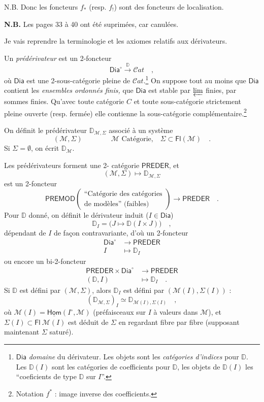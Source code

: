 \documentclass[11pt]{article}
\newcommand{\printedpage}[1]{\marginpar{\footnotesize p.~#1}}
\newcommand{\msp}[1]{\marginpar{\footnotesize [#1]}}
\newcommand{\DD}{\mathbb{D}}
\newcommand{\sDia}{\mathsf{Dia}}
\begin{document}
N.B. Donc les foncteurs $f_*$ (resp. $f_!$) sont des foncteurs de localisation.

\textbf{N.B.} Les pages 33 à 40 ont été suprimées, car canulées. %

\msp{page 41}
Je vais reprendre la terminologie et les axiomes relatifs aux dérivateurs.

Un \textit{prédérivateur} est un 2-foncteur
\[ \sDia^\circ \xrightarrow{\DD} \mathcal{C}at \quad , \]
où $\sDia$ est une 2-sous-catégorie pleine de $\mathcal{C}at$.\footnote[11]{$\sDia$ \textit{domaine} du dérivateur. Les objets sont les \textit{catégories d'indices} pour $\DD$. Les $\DD(I)$ sont les catégories de coefficients pour $\DD$, les objets de $\DD(I)$ les “coeficients de type $\DD$ sur $I$”. %
} On suppose tout au moins que $\sDia$ contient les \textit{ensembles ordonnés finis,} que $\sDia$ est stable par $\varprojlim$ finies, par sommes finies. Qu'avec toute catégorie $C$ et toute sous-catégorie strictement pleine ouverte (resp. fermée) elle contienne la sous-catégorie complémentaire.\footnote[12]{Notation $f^*$ : image inverse des coefficients.}

\printedpage{23}
\msp{page 42}
On définit le prédérivateur $\DD_{\mathcal{M},\Sigma}$ associé à un système
\[ (\mathcal{M},\Sigma) \qquad\qquad \mathcal{M} \text{ Catégorie,} \quad \Sigma \subset \mathsf{Fl}(\mathcal{M}) \quad . \] %
Si $\Sigma = \emptyset$, on écrit $\DD_{\mathcal{M}}$.

Les prédérivateurs forment une 2- catégorie $\mathsf{PREDER}$, et
\[ (\mathcal{M},\Sigma) \longmapsto \DD_{\mathcal{M},\Sigma} \]
est un 2-foncteur
\[ \mathsf{PREMOD}
\begin{pmatrix}
\text{“Catégorie des catégories} \\
\text{de modèles” (faibles)}
\end{pmatrix}
\longrightarrow \mathsf{PREDER} \quad . \]
Pour $\DD$ donné, on définit le dérivateur induit ($I \in \sDia$)
\[ \DD_I = \big(J \longmapsto \DD(I \times J)\big) \quad , \]
dépendant de $I$ de façon contravariante, d'où un 2-foncteur
\[ \begin{aligned}
\sDia^\circ &\longrightarrow \mathsf{PREDER} \\
I &\longmapsto \DD_I
\end{aligned} \]
ou encore un bi-2-foncteur
\[ \begin{aligned}
\mathsf{PREDER} \times \sDia^\circ &\longrightarrow \mathsf{PREDER} \\
(\DD, I) &\longmapsto \DD_I \quad .
\end{aligned} \]
Si $\DD$ est défini par $(\mathcal{M},\Sigma)$, alors $\DD_I$ est défini par $(\mathcal{M}(I),\Sigma(I))$ :
\[ (\DD_{\mathcal{M},\Sigma})_I \simeq \DD_{\mathcal{M}(I),\Sigma(I)} \quad , \]
\msp{page 43}
où $\mathcal{M}(I) = \underline{\mathsf{Hom}}(I^\circ,\mathcal{M})$ (préfaisceaux sur $I$ à valeurs dans $\mathcal{M}$), et $\Sigma(I) \subset \mathsf{Fl}\ \mathcal{M}(I)$ est déduit de $\Sigma$ en regardant fibre par fibre (supposant maintenant $\Sigma$ saturé). %
\end{document}
